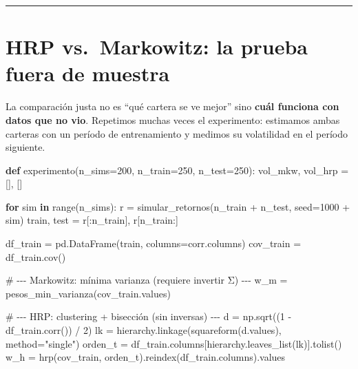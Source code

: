\documentclass[
  spanish,
  letterpaper,
  DIV=11,
  numbers=noendperiod]{scrreprt}
\newenvironment{Shaded}{\begin{snugshade}}{\end{snugshade}}
\newcommand{\BuiltInTok}[1]{\textcolor[rgb]{0.00,0.23,0.31}{#1}}
\newcommand{\CommentTok}[1]{\textcolor[rgb]{0.37,0.37,0.37}{#1}}
\newcommand{\ControlFlowTok}[1]{\textcolor[rgb]{0.00,0.23,0.31}{\textbf{#1}}}
\newcommand{\DecValTok}[1]{\textcolor[rgb]{0.68,0.00,0.00}{#1}}
\newcommand{\KeywordTok}[1]{\textcolor[rgb]{0.00,0.23,0.31}{\textbf{#1}}}
\newcommand{\NormalTok}[1]{\textcolor[rgb]{0.00,0.23,0.31}{#1}}
\newcommand{\OperatorTok}[1]{\textcolor[rgb]{0.37,0.37,0.37}{#1}}
\newcommand{\StringTok}[1]{\textcolor[rgb]{0.13,0.47,0.30}{#1}}
\begin{document}
\begin{center}\rule{0.5\linewidth}{0.5pt}\end{center}

\chapter{HRP vs.~Markowitz: la prueba fuera de
muestra}\label{hrp-vs.-markowitz-la-prueba-fuera-de-muestra}

La comparación justa no es ``qué cartera se ve mejor'' sino \textbf{cuál
funciona con datos que no vio}. Repetimos muchas veces el experimento:
estimamos ambas carteras con un período de entrenamiento y medimos su
volatilidad en el período siguiente.

\label{comparacion-oos}
\begin{Shaded}
\begin{Highlighting}[]
\KeywordTok{def}\NormalTok{ experimento(n\_sims}\OperatorTok{=}\DecValTok{200}\NormalTok{, n\_train}\OperatorTok{=}\DecValTok{250}\NormalTok{, n\_test}\OperatorTok{=}\DecValTok{250}\NormalTok{):}
\NormalTok{    vol\_mkw, vol\_hrp }\OperatorTok{=}\NormalTok{ [], []}

    \ControlFlowTok{for}\NormalTok{ sim }\KeywordTok{in} \BuiltInTok{range}\NormalTok{(n\_sims):}
\NormalTok{        r }\OperatorTok{=}\NormalTok{ simular\_retornos(n\_train }\OperatorTok{+}\NormalTok{ n\_test, seed}\OperatorTok{=}\DecValTok{1000} \OperatorTok{+}\NormalTok{ sim)}
\NormalTok{        train, test }\OperatorTok{=}\NormalTok{ r[:n\_train], r[n\_train:]}

\NormalTok{        df\_train }\OperatorTok{=}\NormalTok{ pd.DataFrame(train, columns}\OperatorTok{=}\NormalTok{corr.columns)}
\NormalTok{        cov\_train }\OperatorTok{=}\NormalTok{ df\_train.cov()}

        \CommentTok{\# {-}{-}{-} Markowitz: mínima varianza (requiere invertir Σ) {-}{-}{-}}
\NormalTok{        w\_m }\OperatorTok{=}\NormalTok{ pesos\_min\_varianza(cov\_train.values)}

        \CommentTok{\# {-}{-}{-} HRP: clustering + bisección (sin inversas) {-}{-}{-}}
\NormalTok{        d }\OperatorTok{=}\NormalTok{ np.sqrt((}\DecValTok{1} \OperatorTok{{-}}\NormalTok{ df\_train.corr()) }\OperatorTok{/} \DecValTok{2}\NormalTok{)}
\NormalTok{        lk }\OperatorTok{=}\NormalTok{ hierarchy.linkage(squareform(d.values), method}\OperatorTok{=}\StringTok{"single"}\NormalTok{)}
\NormalTok{        orden\_t }\OperatorTok{=}\NormalTok{ df\_train.columns[hierarchy.leaves\_list(lk)].tolist()}
\NormalTok{        w\_h }\OperatorTok{=}\NormalTok{ hrp(cov\_train, orden\_t).reindex(df\_train.columns).values}


\end{Highlighting}
\end{Shaded}
\end{document}
